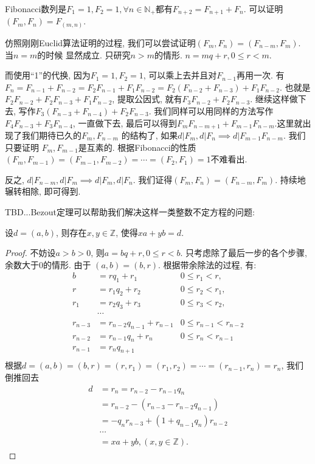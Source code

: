 \begin{example}
    Fibonacci数列是$F_1=1, F_2=1, \forall n\in \mathbb N_+$都有$F_{n+2}=F_{n+1}+F_{n}$. 
    可以证明$(F_m, F_n) = F_{(m, n)}$. 

    仿照刚刚Euclid算法证明的过程, 我们可以尝试证明$(F_m, F_n) = (F_{n-m}, F_m)$. 当$n=m$的时候
    显然成立. 只研究$n>m$的情形. $n=mq+r, 0\leq r <m$. 

    而使用``1''的代换, 因为$F_1=1, F_2=1$, 可以乘上去并且对$F_{n-1}$再用一次. 有
    $F_n=F_{n-1}+F_{n-2}=F_2F_{n-1}+F_1F_{n-2}=F_2(F_{n-2}+F_{n-3})+F_1F_{n-2}$. 也就是
    $F_2F_{n-2}+F_2F_{n-3}+F_1F_{n-2}$, 提取公因式, 就有$F_3F_{n-2}+F_2F_{n-3}$. 继续这样做下去, 
    写作$F_3(F_{n-3}+F_{n-4})+F_2F_{n-3}$. 我们同样可以用同样的方法写作$F_4F_{n-3}+F_3F_{n-4}$, 
    一直做下去, 最后可以得到$F_mF_{n-m+1}+F_{m-1}F_{n-m}$.这里就出现了我们期待已久的$F_m, F_{n-m}$
    的结构了, 如果$d|F_m, d|F_n\implies d|F_{m-1}F_{n-m}$. 我们只要证明
    $F_m, F_{m-1}$是互素的. 根据Fibonacci的性质$(F_m, F_{m-1})=(F_{m-1}, F_{m-2})=\cdots=(F_2,
     F_1)=1$不难看出. 

    反之, $d|F_{n-m}, d|F_m \implies d|F_m, d|F_n$. 我们证得$(F_m, F_n) = (F_{n-m}, F_m)$. 
    持续地辗转相除, 即可得到. 
\end{example}

 TBD...Bezout定理可以帮助我们解决这样一类整数不定方程的问题: 

\begin{theorem}
    设$d=(a, b)$, 则存在$x,y\in\mathbb Z$, 使得$xa+yb=d$. 
\end{theorem}

\begin{proof}
    不妨设$a>b>0$, 则$a=bq+r, 0\leq r<b$. 只考虑除了最后一步的各个步骤, 余数大于0的情形. 由于
    $(a, b)=(b, r)$. 根据带余除法的过程, 有: 
    \begin{align*}
        b&=rq_1+r_1 &  0\leq r_1 < r,   \\
        r&=r_1q_2+r_2 &  0\leq r_2 < r_1,   \\
        r_1&=r_2q_3+r_3 &  0\leq r_3 < r_2,   \\
        &\cdots\\
        r_{n-3}&= r_{n-2}q_{n-1}+r_{n-1} & 0\leq r_{n-1}<r_{n-2}\\
        r_{n-2}&= r_{n-1}q_n+r_n & 0\leq r_n<r_{n-1}\\
        r_{n-1}&=r_nq_{n+1}   \\
    \end{align*}
    根据$d=(a, b)=(b,r)=(r, r_1)=(r_1, r_2)=\cdots=(r_{n-1}, r_n)=r_n$, 我们倒推回去
    \begin{align*}
    d&=r_n=r_{n-2}-r_{n-1}q_n \\
    &= r_{n-2}-(r_{n-3}-r_{n-2}q_{n-1}) \\
    &= -q_n r_{n-3}+(1+q_{n-1}q_n)r_{n-2} \\ 
    &\cdots \\
    &= xa+yb, (x, y\in \mathbb Z).
    \end{align*}
\end{proof}


